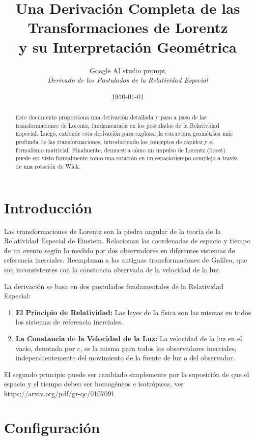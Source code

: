 \documentclass[11pt,a4paper]{article}
\title{Una Derivación Completa de las Transformaciones de Lorentz \\ y su Interpretación Geométrica}
\author{\href{https://bit.ly/lorentztransformation}{Google AI studio prompt}\\ \small \emph{Derivado de los Postulados de la Relatividad Especial}}
\date{\today}
\begin{document}
\maketitle
\tableofcontents


\begin{abstract}
Este documento proporciona una derivación detallada y paso a paso de las transformaciones de Lorentz, fundamentada en los postulados de la Relatividad Especial. Luego, extiende esta derivación para explorar la estructura geométrica más profunda de las transformaciones, introduciendo los conceptos de rapidez y el formalismo matricial. Finalmente, demuestra cómo un impulso de Lorentz (boost) puede ser visto formalmente como una rotación en un espaciotiempo complejo a través de una rotación de Wick.
\end{abstract}

\section{Introducción}

Las transformaciones de Lorentz son la piedra angular de la teoría de la Relatividad Especial de Einstein. Relacionan las coordenadas de espacio y tiempo de un evento según lo medido por dos observadores en diferentes sistemas de referencia inerciales. Reemplazan a las antiguas transformaciones de Galileo, que son inconsistentes con la constancia observada de la velocidad de la luz.

La derivación se basa en dos postulados fundamentales de la Relatividad Especial:
\begin{enumerate}
    \item \textbf{El Principio de Relatividad:} Las leyes de la física son las mismas en todos los sistemas de referencia inerciales.
    \item \textbf{La Constancia de la Velocidad de la Luz:} La velocidad de la luz en el vacío, denotada por $c$, es la misma para todos los observadores inerciales, independientemente del movimiento de la fuente de luz o del observador.
\end{enumerate}

El segundo principio puede ser cambiado simplemente por la suposición de que el espacio y el tiempo deben ser homogéneos e isotrópicos, ver \url{https://arxiv.org/pdf/gr-qc/0107091}

\section{Configuración}
\end{document}
